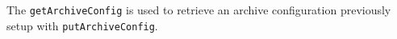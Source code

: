 The \verb+getArchiveConfig+ is used to retrieve an archive configuration previously setup with \verb+putArchiveConfig+.
